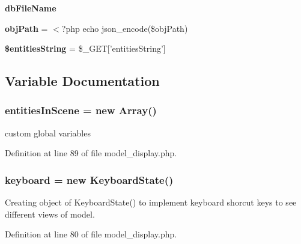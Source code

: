 \begin{DoxyCompactItemize}
\item 
\hypertarget{model__display_8php_a449d9e9473792f0a2b1a61a2d401bd81}{{\bfseries db\-File\-Name}}\label{model__display_8php_a449d9e9473792f0a2b1a61a2d401bd81}

\item 
\hypertarget{model__display_8php_aa2869b05f772ae0666ce6ace22a1fbec}{{\bfseries obj\-Path} = $<$?php echo json\-\_\-encode(\$obj\-Path)}\label{model__display_8php_aa2869b05f772ae0666ce6ace22a1fbec}

\item 
\hypertarget{model__display_8php_af9e0b031c25b0109bd867dde7c995608}{{\bfseries \$entities\-String} = \$\-\_\-\-G\-E\-T\mbox{[}'entities\-String'\mbox{]}}\label{model__display_8php_af9e0b031c25b0109bd867dde7c995608}

\end{DoxyCompactItemize}


\subsection{Variable Documentation}
\hypertarget{model__display_8php_a979a99c92317f74763728af573f3ddb4}{
\subsubsection[{entities\-In\-Scene}]{\setlength{\rightskip}{0pt plus 5cm}entities\-In\-Scene = new Array()}}\label{model__display_8php_a979a99c92317f74763728af573f3ddb4}
custom global variables 

Definition at line 89 of file model\-\_\-display.\-php.

\hypertarget{model__display_8php_a9976f3faad68f981f425583e48b03252}{
\subsubsection[{keyboard}]{\setlength{\rightskip}{0pt plus 5cm}keyboard = new Keyboard\-State()}}\label{model__display_8php_a9976f3faad68f981f425583e48b03252}
Creating object of Keyboard\-State() to implement keyboard shorcut keys to see different views of model. 

Definition at line 80 of file model\-\_\-display.\-php.

